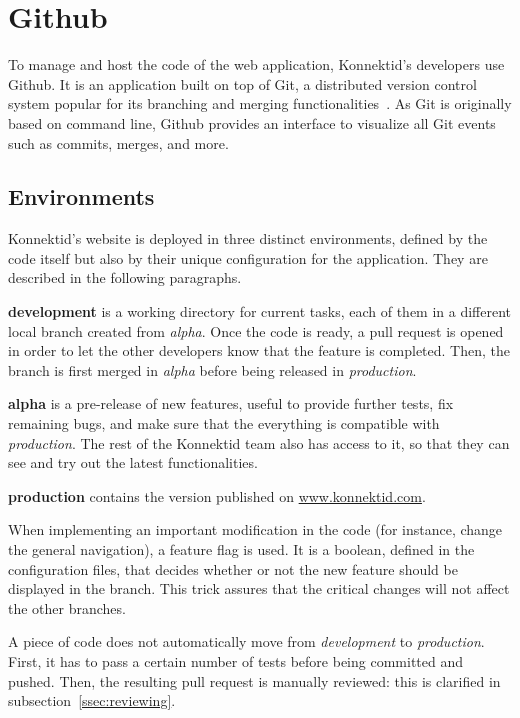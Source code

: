 \section{Github}
\label{sec:github}

To manage and host the code of the web application, Konnektid's developers use Github. It is an application built on top of Git, a distributed version control system popular for its branching and merging functionalities~\cite{git}. As Git is originally based on command line, Github provides an interface to visualize all Git events such as commits, merges, and more.

\subsection{Environments}
\label{ssec:env}

Konnektid's website is deployed in three distinct environments, defined by the code itself but also by their unique configuration for the application. They are described in the following paragraphs.

\textbf{development} is a working directory for current tasks, each of them in a different local branch created from \textit{alpha}. Once the code is ready, a pull request is opened in order to let the other developers know that the feature is completed. Then, the branch is first merged in \textit{alpha} before being released in \textit{production}. 

\textbf{alpha} is a pre-release of new features, useful to provide further tests, fix remaining bugs, and make sure that the everything is compatible with \textit{production}. The rest of the Konnektid team also has access to it, so that they can see and try out the latest functionalities.

\textbf{production} contains the version published on \url{www.konnektid.com}.

When implementing an important modification in the code (for instance, change the general navigation), a \guillemotleft{} feature flag \guillemotright{} is used. It is a boolean, defined in the configuration files, that decides whether or not the new feature should be displayed in the branch. This trick assures that the critical changes will not affect the other branches.

A piece of code does not automatically move from \textit{development} to \textit{production}. First, it has to pass a certain number of tests before being committed and pushed. Then, the resulting pull request is manually reviewed: this is clarified in {\sc subsection}~\ref{ssec:reviewing}.

